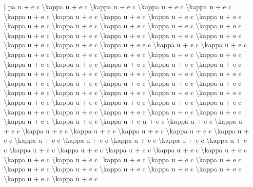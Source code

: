 \documentclass[
]{article}
\begin{document}
{[} pa u + e c \textbackslash kappa u + e c \textbackslash kappa u + e c
\textbackslash kappa u + e c \textbackslash kappa u + e c
\textbackslash kappa u + e c \textbackslash kappa u + e c
\textbackslash kappa u + e c \textbackslash kappa u + e c
\textbackslash kappa u + e c \textbackslash kappa u + e c
\textbackslash kappa u + e c \textbackslash kappa u + e c
\textbackslash kappa u + e c \textbackslash kappa u + e c
\textbackslash kappa u + e c \textbackslash kappa u + e c
\textbackslash kappa u + e c \textbackslash kappa u + e c
\textbackslash kappa u + e c \textbackslash kappa u + e c
\textbackslash kappa u + e c \textbackslash kappa u + e e c
\textbackslash kappa u + e c \textbackslash kappa u + e c
\textbackslash kappa u + e c \textbackslash kappa u + e c
\textbackslash kappa u + e c \textbackslash kappa u + e c
\textbackslash kappa u + e c \textbackslash kappa u + e c
\textbackslash kappa u + e c \textbackslash kappa u + e c
\textbackslash kappa u + e c \textbackslash kappa u + e c
\textbackslash kappa u + e c \textbackslash kappa u + e c
\textbackslash kappa u + e c \textbackslash kappa u + e c
\textbackslash kappa u + e c \textbackslash kappa u + e c
\textbackslash kappa u + e c \textbackslash kappa u + e c
\textbackslash kappa u + e c \textbackslash kappa u + e c
\textbackslash kappa u + e c \textbackslash kappa u + e c
\textbackslash kappa u + e c \textbackslash kappa u + e c
\textbackslash kappa u + e c \textbackslash kappa u + e c
\textbackslash kappa u + e c \textbackslash kappa u + e c
\textbackslash kappa u + e c \textbackslash kappa u + e c
\textbackslash kappa u + e c \textbackslash kappa u + e c
\textbackslash kappa u + e c \textbackslash kappa u + e c
\textbackslash kappa u + e c \textbackslash kappa u + e c
\textbackslash kappa u + e c \textbackslash kappa u + e u + e c
\textbackslash kappa u + e c \textbackslash kappa u + e c
\textbackslash kappa u + e c \textbackslash kappa u + e c
\textbackslash kappa u + e c \textbackslash kappa u + e c
\textbackslash kappa u + e c \textbackslash kappa u + e c
\textbackslash kappa u + e c \textbackslash kappa u + e c
\textbackslash kappa u + e c \textbackslash kappa u + e c
\textbackslash kappa u + e c \textbackslash kappa u + e c
\textbackslash kappa u + e c \textbackslash kappa u + e c
\textbackslash kappa u + e c \textbackslash kappa u + e c
\textbackslash kappa u + e c ~kappa u + e c \textbackslash kappa u + e c
\textbackslash kappa u + e c \textbackslash kappa u + e c
\textbackslash kappa u + e c \textbackslash kappa u + e c
\textbackslash kappa u + e c \textbackslash kappa u + e c
\textbackslash kappa u + e c \textbackslash kappa u + e c
\end{document}
